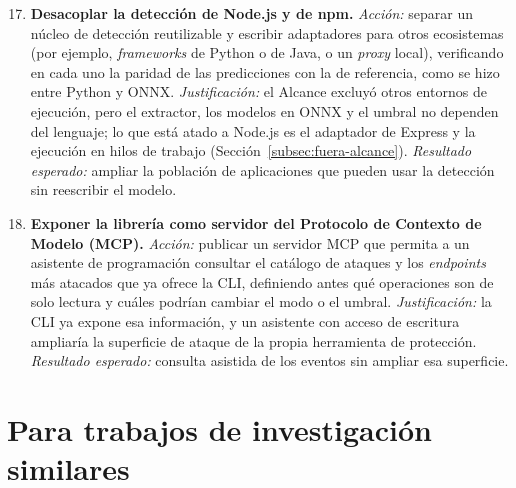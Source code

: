 \begin{enumerate}
    \setcounter{enumi}{16}
    \item \textbf{Desacoplar la detección de Node.js y de npm.} \textit{Acción:} separar un
    núcleo de detección reutilizable y escribir adaptadores para otros ecosistemas (por ejemplo,
    \textit{frameworks} de Python o de Java, o un \textit{proxy} local), verificando en cada uno la
    paridad de las predicciones con la de referencia, como se hizo entre Python y ONNX.
    \textit{Justificación:} el Alcance excluyó otros entornos de ejecución, pero el extractor, los
    modelos en ONNX y el umbral no dependen del lenguaje; lo que está atado a Node.js es el
    adaptador de Express y la ejecución en hilos de trabajo (Sección~\ref{subsec:fuera-alcance}).
    \textit{Resultado esperado:} ampliar la población de aplicaciones que pueden usar la detección
    sin reescribir el modelo.

    \item \textbf{Exponer la librería como servidor del Protocolo de Contexto de Modelo (MCP).}
    \textit{Acción:} publicar un servidor MCP que permita a un asistente de programación consultar
    el catálogo de ataques y los \textit{endpoints} más atacados que ya ofrece la CLI, definiendo
    antes qué operaciones son de solo lectura y cuáles podrían cambiar el modo o el umbral.
    \textit{Justificación:} la CLI ya expone esa información, y un asistente con acceso de
    escritura ampliaría la superficie de ataque de la propia herramienta de protección.
    \textit{Resultado esperado:} consulta asistida de los eventos sin ampliar esa superficie.
\end{enumerate}

\section{Para trabajos de investigación similares}


